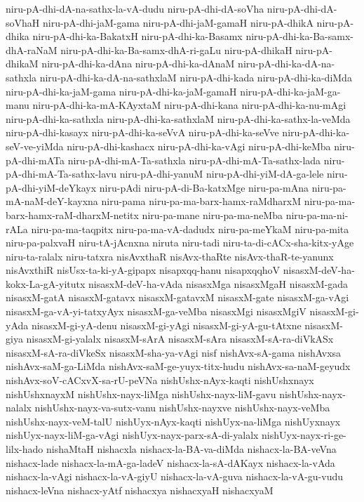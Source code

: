{niru-pA-dhi-dA-na-sathx-la-vA-dudu
niru-pA-dhi-dA-soVha
niru-pA-dhi-dA-soVhaH
niru-pA-dhi-jaM-gama
niru-pA-dhi-jaM-gamaH
niru-pA-dhikA
niru-pA-dhika
niru-pA-dhi-ka-BakatxH
niru-pA-dhi-ka-Basamx
niru-pA-dhi-ka-Ba-samx-dhA-raNaM
niru-pA-dhi-ka-Ba-samx-dhA-ri-gaLu
niru-pA-dhikaH
niru-pA-dhikaM
niru-pA-dhi-ka-dAna
niru-pA-dhi-ka-dAnaM
niru-pA-dhi-ka-dA-na-sathxla
niru-pA-dhi-ka-dA-na-sathxlaM
niru-pA-dhi-kada
niru-pA-dhi-ka-diMda
niru-pA-dhi-ka-jaM-gama
niru-pA-dhi-ka-jaM-gamaH
niru-pA-dhi-ka-jaM-ga-manu
niru-pA-dhi-ka-mA-KAyxtaM
niru-pA-dhi-kana
niru-pA-dhi-ka-nu-mAgi
niru-pA-dhi-ka-sathxla
niru-pA-dhi-ka-sathxlaM
niru-pA-dhi-ka-sathx-la-veMda
niru-pA-dhi-kasayx
niru-pA-dhi-ka-seVvA
niru-pA-dhi-ka-seVve
niru-pA-dhi-ka-seV-ve-yiMda
niru-pA-dhi-kashacx
niru-pA-dhi-ka-vAgi
niru-pA-dhi-keMba
niru-pA-dhi-mATa
niru-pA-dhi-mA-Ta-sathxla
niru-pA-dhi-mA-Ta-sathx-lada
niru-pA-dhi-mA-Ta-sathx-lavu
niru-pA-dhi-yanuM
niru-pA-dhi-yiM-dA-ga-lele
niru-pA-dhi-yiM-deYkayx
niru-pAdi
niru-pA-di-Ba-katxMge
niru-pa-mAna
niru-pa-mA-naM-deY-kayxna
niru-pama
niru-pa-ma-barx-hamx-raMdharxM
niru-pa-ma-barx-hamx-raM-dharxM-netitx
niru-pa-mane
niru-pa-ma-neMba
niru-pa-ma-ni-rALa
niru-pa-ma-taqpitx
niru-pa-ma-vA-dadudx
niru-pa-meYkaM
niru-pa-mita
niru-pa-palxvaH
niru-tA-jAcnxna
niruta
niru-tadi
niru-ta-di-cACx-sha-kitx-yAge
niru-ta-ralalx
niru-tatxra
nisAvxthaR
nisAvx-thaRte
nisAvx-thaR-te-yanunx
nisAvxthiR
nisUsx-ta-ki-yA-gipapx
nisapxqq-hanu
nisapxqqhoV
nisasxM-deV-ha-kokx-La-gA-yitutx
nisasxM-deV-ha-vAda
nisasxMga
nisasxMgaH
nisasxM-gada
nisasxM-gatA
nisasxM-gatavx
nisasxM-gatavxM
nisasxM-gate
nisasxM-ga-vAgi
nisasxM-ga-vA-yi-tatxyAyx
nisasxM-ga-veMba
nisasxMgi
nisasxMgiV
nisasxM-gi-yAda
nisasxM-gi-yA-denu
nisasxM-gi-yAgi
nisasxM-gi-yA-gu-tAtxne
nisasxM-giya
nisasxM-gi-yalalx
nisasxM-sArA
nisasxM-sAra
nisasxM-sA-ra-diVkASx
nisasxM-sA-ra-diVkeSx
nisasxM-sha-ya-vAgi
nisf
nishAvx-sA-gama
nishAvxsa
nishAvx-saM-ga-LiMda
nishAvx-saM-ge-yuyx-titx-hudu
nishAvx-sa-naM-geyudx
nishAvx-soV-cACxvX-sa-rU-peVNa
nishUshx-nAyx-kaqti
nishUshxnayx
nishUshxnayxM
nishUshx-nayx-liMga
nishUshx-nayx-liM-gavu
nishUshx-nayx-nalalx
nishUshx-nayx-va-sutx-vanu
nishUshx-nayxve
nishUshx-nayx-veMba
nishUshx-nayx-veM-talU
nishUyx-nAyx-kaqti
nishUyx-na-liMga
nishUyxnayx
nishUyx-nayx-liM-ga-vAgi
nishUyx-nayx-parx-sA-di-yalalx
nishUyx-nayx-ri-ge-lilx-hado
nishaMtaH
nishacxla
nishacx-la-BA-va-diMda
nishacx-la-BA-veVna
nishacx-lade
nishacx-la-mA-ga-ladeV
nishacx-la-sA-dAKayx
nishacx-la-vAda
nishacx-la-vAgi
nishacx-la-vA-giyU
nishacx-la-vA-guva
nishacx-la-vA-gu-vudu
nishacx-leVna
nishacx-yAtf
nishacxya
nishacxyaH
nishacxyaM
}
